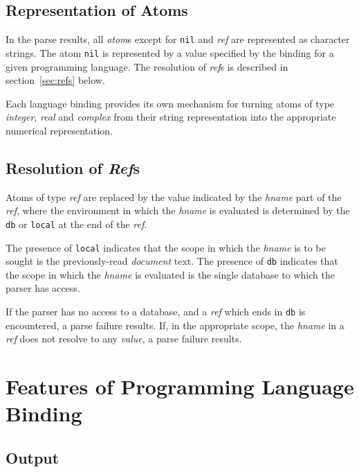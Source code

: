 \documentclass{memarticle}
\begin{document}
	\subsection{Representation of Atoms}
		In the parse results,
		all \emph{atom}s
		except for \texttt{nil} and \emph{ref}
		are represented
		as character strings.
		The atom \texttt{nil} is represented by a 
		value specified by the binding for a given programming language.
		The resolution of \emph{ref}s is described in section~\ref{sec:refs} below.
		\vspace{1mm}
		\par
		Each language binding
		provides its own mechanism
		for turning atoms of type \emph{integer}, \emph{real} and \emph{complex}
		from their string representation
		into the appropriate numerical representation.

	\subsection{Resolution of \emph{Ref}s\label{sec:refs}}
		Atoms of type \emph{ref} are replaced
		by the value indicated by the \emph{hname} part of the \emph{ref},
		where the environment in which the \emph{hname} is evaluated is determined
		by the \texttt{db} or \texttt{local} at the end of the \emph{ref}.
		\vspace{1mm}
		\par
		The presence of \texttt{local} indicates 
		that the scope in which the \emph{hname} is to be sought
		is the previously-read \emph{document} text.
		The presence of 
		\texttt{db} indicates
		that the scope in which the \emph{hname} is evaluated
		is the single database
		to which the parser has access.
		\vspace{1mm}
		\par
		If the parser has no access to a database,
		and a \emph{ref} which ends in \texttt{db} is encountered,
		a parse failure results.
		If,
		in the appropriate scope,
		the \emph{hname} in a \emph{ref} does not resolve to any \emph{value},
		a parse failure results.
		
\section{Features of Programming Language Binding}

	\subsection{Output}
\end{document}
